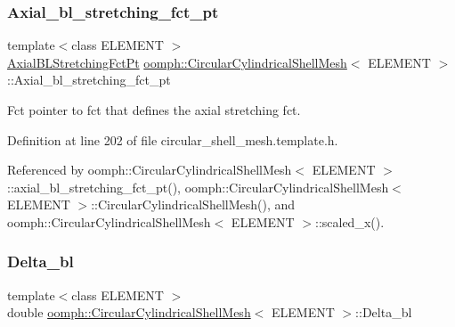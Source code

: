 \subsubsection{\texorpdfstring{Axial\+\_\+bl\+\_\+stretching\+\_\+fct\+\_\+pt}{Axial\_bl\_stretching\_fct\_pt}}
{\footnotesize\ttfamily template$<$class E\+L\+E\+M\+E\+NT $>$ \\
\hyperlink{classoomph_1_1CircularCylindricalShellMesh_a770336fa72e8911f31b9fe3f70197a51}{Axial\+B\+L\+Stretching\+Fct\+Pt} \hyperlink{classoomph_1_1CircularCylindricalShellMesh}{oomph\+::\+Circular\+Cylindrical\+Shell\+Mesh}$<$ E\+L\+E\+M\+E\+NT $>$\+::Axial\+\_\+bl\+\_\+stretching\+\_\+fct\+\_\+pt\hspace{0.3cm}{\ttfamily [private]}}



Fct pointer to fct that defines the axial stretching fct. 



Definition at line 202 of file circular\+\_\+shell\+\_\+mesh.\+template.\+h.



Referenced by oomph\+::\+Circular\+Cylindrical\+Shell\+Mesh$<$ E\+L\+E\+M\+E\+N\+T $>$\+::axial\+\_\+bl\+\_\+stretching\+\_\+fct\+\_\+pt(), oomph\+::\+Circular\+Cylindrical\+Shell\+Mesh$<$ E\+L\+E\+M\+E\+N\+T $>$\+::\+Circular\+Cylindrical\+Shell\+Mesh(), and oomph\+::\+Circular\+Cylindrical\+Shell\+Mesh$<$ E\+L\+E\+M\+E\+N\+T $>$\+::scaled\+\_\+x().

\mbox{\label{classoomph_1_1CircularCylindricalShellMesh_a935925bc28901cf99f2ebdc2cff1b692}} 
\subsubsection{\texorpdfstring{Delta\+\_\+bl}{Delta\_bl}}
{\footnotesize\ttfamily template$<$class E\+L\+E\+M\+E\+NT $>$ \\
double \hyperlink{classoomph_1_1CircularCylindricalShellMesh}{oomph\+::\+Circular\+Cylindrical\+Shell\+Mesh}$<$ E\+L\+E\+M\+E\+NT $>$\+::Delta\+\_\+bl\hspace{0.3cm}{\ttfamily [private]}}



